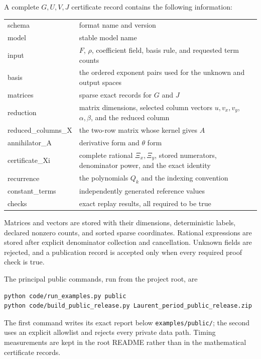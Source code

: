 \documentclass[11pt]{article}
\begin{document}
A complete $G,U,V,J$ certificate record contains the following information:
\begin{center}
\small
\begin{tabular}{>{\ttfamily}p{}p{}}
\toprule
schema & format name and version\\
model & stable model name\\
input & $F$, $\rho$, coefficient field, basis rule, and requested term counts\\
basis & the ordered exponent pairs used for the unknown and output spaces\\
matrices & sparse exact records for $G$ and $J$\\
reduction & matrix dimensions, selected column vectors $u,v_x,v_y$, $\alpha,\beta$, and the reduced column\\
reduced\_columns\_X & the two-row matrix whose kernel gives $A$\\
annihilator\_A & derivative form and $\theta$ form\\
certificate\_Xi & complete rational $\Xi_x,\Xi_y$, stored numerators, denominator power, and the exact identity\\
recurrence & the polynomials $Q_k$ and the indexing convention\\
constant\_terms & independently generated reference values\\
checks & exact replay results, all required to be true\\
\bottomrule
\end{tabular}
\end{center}
Matrices and vectors are stored with their dimensions, deterministic labels,
declared nonzero counts, and sorted sparse coordinates.  Rational expressions
are stored after explicit denominator collection and cancellation.  Unknown
fields are rejected, and a publication record is accepted only when every
required proof check is true.

The principal public commands, run from the project root, are
\begin{verbatim}
python code/run_examples.py public
python code/build_public_release.py Laurent_period_public_release.zip
\end{verbatim}
The first command writes its exact report below \texttt{examples/public/}; the
second uses an explicit allowlist and rejects every private data path.  Timing
measurements are kept in the root README rather than in the mathematical
certificate records.
\end{document}
